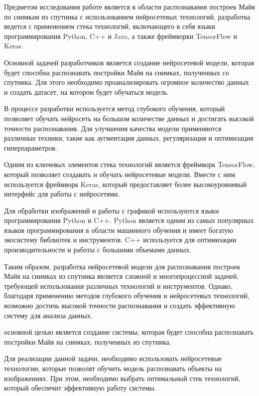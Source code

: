     Предметом исследования работе является в области распознавания построек Майя по снимкам из спутника с использованием нейросетевых технологий, разработка ведется с применением стека технологий, включающего в себя языки программирования Python, C++ и Java, а также фреймворки TensorFlow и Keras.
    
    Основной задачей разработчиков является создание нейросетевой модели, которая будет способна распознавать постройки Майя на снимках, полученных со спутника. Для этого необходимо проанализировать огромное количество данных и создать датасет, на котором будет обучаться модель.
    
    В процессе разработки используется метод глубокого обучения, который позволяет обучать нейросеть на большом количестве данных и достигать высокой точности распознавания. Для улучшения качества модели применяются различные техники, такие как аугментация данных, регуляризация и оптимизация гиперпараметров.
    
    Одним из ключевых элементов стека технологий является фреймворк TensorFlow, который позволяет создавать и обучать нейросетевые модели. Вместе с ним используется фреймворк Keras, который предоставляет более высокоуровневый интерфейс для работы с нейросетями.
    
    Для обработки изображений и работы с графикой используются языки программирования Python и C++. Python является одним из самых популярных языков программирования в области машинного обучения и имеет богатую экосистему библиотек и инструментов. C++ используется для оптимизации производительности и работы с большими объемами данных.
    
    Таким образом, разработка нейросетевой модели для распознавания построек Майя на снимках из спутника является сложной и многопроцессной задачей, требующей использования различных технологий и инструментов. Однако, благодаря применению методов глубокого обучения и нейросетевых технологий, возможно достичь высокой точности распознавания и создать эффективную систему для анализа данных.
    
    основной целью является создание системы, которая будет способна распознавать постройки Майя на снимках, полученных из спутника. 
    
    Для реализации данной задачи, необходимо использовать нейросетевые технологии, которые позволят обучить модель распознавать объекты на изображениях. При этом, необходимо выбрать оптимальный стек технологий, который обеспечит эффективную работу системы. 
    
